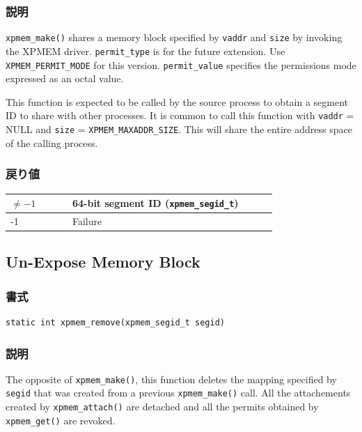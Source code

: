 \documentclass[twoside,11pt,fleqn]{book}
\begin{document}
\subsubsection*{説明}{\quad}
\texttt{xpmem\_make()} shares a memory block specified by \texttt{vaddr} and \texttt{size} by invoking the XPMEM driver.
\texttt{permit\_type} is for the future extension. Use \texttt{XPMEM\_PERMIT\_MODE} for this version.
\texttt{permit\_value} specifies the permissions mode expressed as an octal value.

This function is expected to be called by the source process to obtain a segment ID to share with other
processes. It is common to call this function with \texttt{vaddr} = NULL and
\texttt{size} = \texttt{XPMEM\_MAXADDR\_SIZE}. This will share the entire address space of
the calling process.

\subsubsection*{戻り値}{\quad}
\begin{table}[!h]
\footnotesize
\begin{tabular}{|p{0.20\linewidth}|p{0.66\linewidth}|} \hline
$\ne -1$&64-bit segment ID (\texttt{xpmem\_segid\_t})\\ \hline
-1&Failure\\ \hline
\end{tabular}
\vspace{-0em}
\end{table}
\FloatBarrier

\subsection{Un-Expose Memory Block}
\subsubsection*{書式}{\quad}
\begin{verbatim}
static int xpmem_remove(xpmem_segid_t segid)
\end{verbatim}

\subsubsection*{説明}{\quad}
The opposite of \texttt{xpmem\_make()}, this function deletes the mapping specified by 
\texttt{segid} that was created from a previous \texttt{xpmem\_make()} call. 
All the attachements created by \texttt{xpmem\_attach()} are detached and all the permits obtained by \texttt{xpmem\_get()} are revoked.
\end{document}
